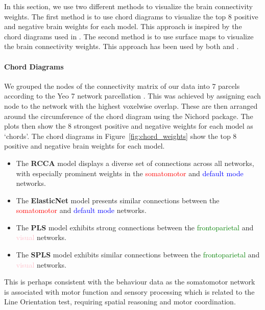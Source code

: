 In this section, we use two different methods to visualize the brain connectivity weights.
The first method is to use chord diagrams to visualize the top 8 positive and negative brain \gls{weights} for each model.
This approach is inspired by the chord diagrams used in \cite{smith2015positive}.
The second method is to use surface maps to visualize the brain connectivity weights.
This approach has been used by both \cite{ferreira2022hierarchical} and \cite{smith2015positive}.

\paragraph{Chord Diagrams}
We grouped the nodes of the connectivity matrix of our data into 7 parcels according to the Yeo 7 network parcellation \cite{yeo2011organisation}.
This was achieved by assigning each node to the network with the highest voxelwise overlap.
These are then arranged around the circumference of the chord diagram using the Nichord package\citep{bogdan2023connsearch}.
The plots then show the 8 strongest positive and negative \gls{weights} for each model as `chords'.
The chord diagrams in Figure~\ref{fig:chord_weights} show the top 8 positive and negative brain \gls{weights} for each model.

\begin{itemize}
    \item The \textbf{RCCA} model displays a diverse set of connections across all networks, with especially prominent weights in the \textcolor{red}{somatomotor} and \textcolor{blue}{default mode} networks.

    \item The \textbf{ElasticNet} model presents similar connections between the \textcolor{red}{somatomotor} and \textcolor{blue}{default mode} networks.

    \item The \textbf{PLS} model exhibits strong connections between the \textcolor{green}{frontoparietal} and \textcolor{pink}{visual} networks.

    \item The \textbf{SPLS} model exhibits similar connections between the \textcolor{green}{frontoparietal} and \textcolor{pink}{visual} networks.
\end{itemize}

This is perhaps consistent with the behaviour data as the somatomotor network is associated with motor function and sensory processing which is related to the Line Orientation test, requiring spatial reasoning and motor coordination.

